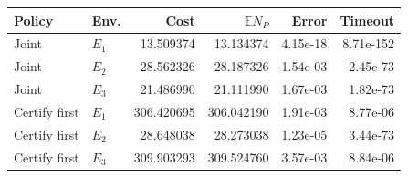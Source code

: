 \begin{tabular}{llrrrr}
\toprule
Policy & Env. & Cost & $\mathbb E N_P$ & Error & Timeout\\
\midrule
Joint & $E_1$ & 13.509374 & 13.134374 & 4.15e-18 & 8.71e-152\\
Joint & $E_2$ & 28.562326 & 28.187326 & 1.54e-03 & 2.45e-73\\
Joint & $E_3$ & 21.486990 & 21.111990 & 1.67e-03 & 1.82e-73\\
Certify first & $E_1$ & 306.420695 & 306.042190 & 1.91e-03 & 8.77e-06\\
Certify first & $E_2$ & 28.648038 & 28.273038 & 1.23e-05 & 3.44e-73\\
Certify first & $E_3$ & 309.903293 & 309.524760 & 3.57e-03 & 8.84e-06\\
\bottomrule
\end{tabular}
